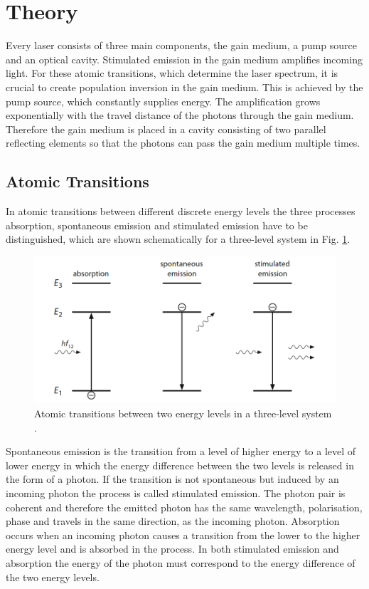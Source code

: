 \section{Theory}
Every laser consists of three main components, the gain medium, a pump source
and an optical cavity. 
Stimulated emission in the gain medium amplifies incoming light. For these atomic transitions,
which determine the laser spectrum, it is crucial to create population inversion in the 
gain medium. This is achieved by the pump source, which constantly supplies energy.
The amplification grows exponentially with the travel distance of the photons through 
the gain medium. Therefore the gain medium is placed in a cavity consisting of two 
parallel reflecting elements so that the photons can pass the gain medium multiple times.

\subsection*{Atomic Transitions}
In atomic transitions between different discrete energy levels the three processes 
absorption, spontaneous emission and stimulated emission have to be distinguished, which are
shown schematically for a three-level system in Fig. \ref{fig:transitions}.
\begin{figure}
    \centering
    \includegraphics[width = 0.8\linewidth]{Bilder/transitions.png}
    \caption{Atomic transitions between two energy levels in a three-level system \cite{eichler}.}
    \label{fig:transitions}
\end{figure}
Spontaneous emission is the transition from a level of higher energy to a level of lower 
energy in which the energy difference between the two levels is released in the form of a photon.
If the transition is not spontaneous but induced by an incoming photon the process is 
called stimulated emission. The photon pair is coherent and therefore the emitted photon has the same wavelength, polarisation, phase and travels in the same direction, as the incoming photon.
Absorption occurs when an incoming photon causes a transition 
from the lower to the higher energy level and is absorbed in the process. 
In both stimulated emission and absorption the energy of the photon must correspond to the energy 
difference of the two energy levels.

